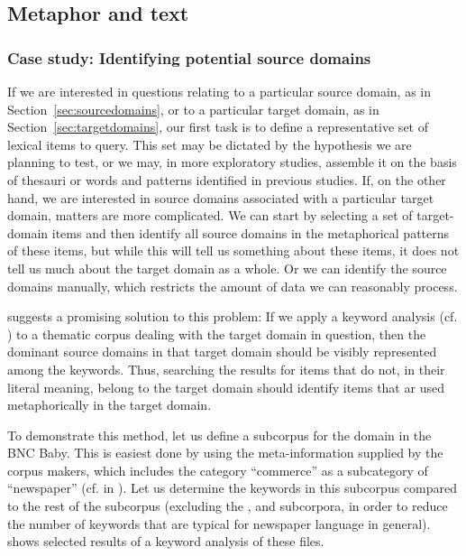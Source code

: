 \subsection{Metaphor and text}
\label{sec:metaphorandtext}

\subsubsection{Case study: Identifying potential source domains}
\label{sec:identifyingpotentialsourcedomains}

If we are interested in questions relating to a particular source domain, as in Section~\ref{sec:sourcedomains}, or to a particular target domain, as in Section~\ref{sec:targetdomains}, our first task is to define a representative  set of lexical items to query.  This set may be dictated by the hypothesis we are planning to test, or we may, in more exploratory studies, assemble it on the basis of thesauri or words and patterns identified in previous studies. If, on the other hand, we are interested in source domains associated  with a particular target domain, matters are more complicated. We can start by selecting a set of target\hyp{}domain items and then identify all source domains in the metaphorical  patterns of these items, but while this will tell us something about these items, it does not tell us much about the target domain as a whole. Or we can identify the source domains manually,  which restricts the amount of data we can reasonably process.

\citet{partington_patterns_1998} suggests a promising solution to this problem: If we apply a keyword  analysis (cf. ) to a thematic corpus dealing with the target domain in question, then the dominant source domains in that target domain should be visibly represented among the keywords. Thus, searching the results for items that do not, in their literal  meaning,  belong to the target domain should identify items that ar used metaphorically  in the target domain.

To demonstrate this method, let us define a subcorpus for the domain  in the BNC Baby.  This is easiest done by using the meta\hyp{}information supplied by the corpus makers, which includes the category ``commerce'' as a subcategory of ``newspaper''  (cf.  in ). Let us determine the keywords  in this subcorpus compared to the rest of the  subcorpus (excluding the ,    and   subcorpora, in order to reduce the number of keywords that are typical for newspaper language in general).  shows selected results of a keyword  analysis of these files.

